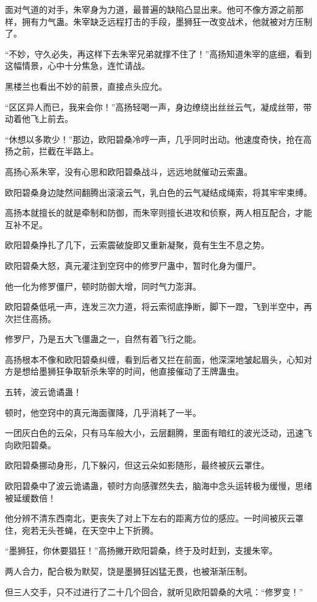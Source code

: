 \begin{this_body}
面对气道的对手，朱宰身为力道，最普遍的缺陷凸显出来。他可不像方源之前那样，拥有力气蛊。朱宰缺乏远程打击的手段，墨狮狂一改变战术，他就被对方压制了。

“不妙，守久必失，再这样下去朱宰兄弟就撑不住了！”高扬知道朱宰的底细，看到这幅情景，心中十分焦急，连忙请战。

黑楼兰也看出不妙的前景，直接点头应允。

“区区异人而已，我来会你！”高扬轻喝一声，身边缭绕出丝丝云气，凝成丝带，带动着他飞上前去。

“休想以多欺少！”那边，欧阳碧桑冷哼一声，几乎同时出动。他速度奇快，抢在高扬之前，拦截在半路上。

高扬心系朱宰，没有心思和欧阳碧桑战斗，远远地就催动云索蛊。

欧阳碧桑身边陡然间翻腾出滚滚云气，乳白色的云气凝结成绳索，将其牢牢束缚。

高扬本就擅长的就是牵制和防御，而朱宰则擅长进攻和侦察，两人相互配合，才能互补不足。

欧阳碧桑挣扎了几下，云索震破旋即又重新凝聚，竟有生生不息之势。

欧阳碧桑大怒，真元灌注到空窍中的修罗尸蛊中，暂时化身为僵尸。

他一化为修罗僵尸，顿时防御大增，同时气力澎湃。

欧阳碧桑低吼一声，连发三次力道，将云索彻底挣断，脚下一蹬，飞到半空中，再次拦住高扬。

修罗尸，乃是五大飞僵蛊之一，自然有着飞行之能。

高扬根本不像和欧阳碧桑纠缠，看到后者又拦在前面，他深深地皱起眉头，心知对方是想给墨狮狂争取斩杀朱宰的时间，他直接催动了王牌蛊虫。

五转，波云诡谲蛊！

顿时，他空窍中的真元海面骤降，几乎消耗了一半。

一团灰白色的云朵，只有马车般大小，云层翻腾，里面有暗红的波光泛动，迅速飞向欧阳碧桑。

欧阳碧桑挪动身形，几下躲闪，但这云朵如影随形，最终被灰云罩住。

欧阳碧桑中了波云诡谲蛊，顿时方向感骤然失去，脑海中念头运转极为缓慢，思绪被延缓数倍！

他分辨不清东西南北，更丧失了对上下左右的距离方位的感应。一时间被灰云罩住，宛若无头苍蝇，在天空中上下折腾。

“墨狮狂，你休要猖狂！”高扬撇开欧阳碧桑，终于及时赶到，支援朱宰。

两人合力，配合极为默契，饶是墨狮狂凶猛无畏，也被渐渐压制。

但三人交手，只不过进行了二十几个回合，就听见欧阳碧桑的大吼：“修罗变！”


\end{this_body}
